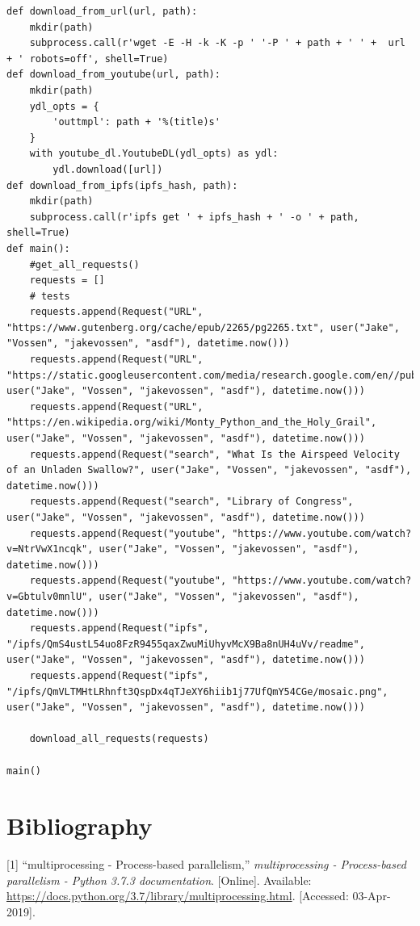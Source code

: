 \documentclass{article}
\begin{document}
\begin{verbatim}
def download_from_url(url, path):
    mkdir(path)
    subprocess.call(r'wget -E -H -k -K -p ' '-P ' + path + ' ' +  url + ' robots=off', shell=True)
def download_from_youtube(url, path):
    mkdir(path)
    ydl_opts = {
        'outtmpl': path + '%(title)s'
    }
    with youtube_dl.YoutubeDL(ydl_opts) as ydl:
        ydl.download([url])
def download_from_ipfs(ipfs_hash, path):
    mkdir(path)
    subprocess.call(r'ipfs get ' + ipfs_hash + ' -o ' + path, shell=True)
def main():
    #get_all_requests()
    requests = []
    # tests
    requests.append(Request("URL", "https://www.gutenberg.org/cache/epub/2265/pg2265.txt", user("Jake", "Vossen", "jakevossen", "asdf"), datetime.now()))
    requests.append(Request("URL", "https://static.googleusercontent.com/media/research.google.com/en//pubs/archive/46507.pdf", user("Jake", "Vossen", "jakevossen", "asdf"), datetime.now()))
    requests.append(Request("URL", "https://en.wikipedia.org/wiki/Monty_Python_and_the_Holy_Grail", user("Jake", "Vossen", "jakevossen", "asdf"), datetime.now()))
    requests.append(Request("search", "What Is the Airspeed Velocity of an Unladen Swallow?", user("Jake", "Vossen", "jakevossen", "asdf"), datetime.now()))
    requests.append(Request("search", "Library of Congress", user("Jake", "Vossen", "jakevossen", "asdf"), datetime.now()))    
    requests.append(Request("youtube", "https://www.youtube.com/watch?v=NtrVwX1ncqk", user("Jake", "Vossen", "jakevossen", "asdf"), datetime.now()))
    requests.append(Request("youtube", "https://www.youtube.com/watch?v=Gbtulv0mnlU", user("Jake", "Vossen", "jakevossen", "asdf"), datetime.now()))
    requests.append(Request("ipfs", "/ipfs/QmS4ustL54uo8FzR9455qaxZwuMiUhyvMcX9Ba8nUH4uVv/readme", user("Jake", "Vossen", "jakevossen", "asdf"), datetime.now()))
    requests.append(Request("ipfs", "/ipfs/QmVLTMHtLRhnft3QspDx4qTJeXY6hiib1j77UfQmY54CGe/mosaic.png", user("Jake", "Vossen", "jakevossen", "asdf"), datetime.now()))    
    
    download_all_requests(requests)

main()
\end{verbatim}
\section{Bibliography}

[1] ``multiprocessing - Process-based parallelism,''
\textit{multiprocessing - Process-based parallelism - Python 3.7.3
  documentation}. [Online]. Available:
\url{https://docs.python.org/3.7/library/multiprocessing.html}. [Accessed:
03-Apr-2019].
\end{document}
